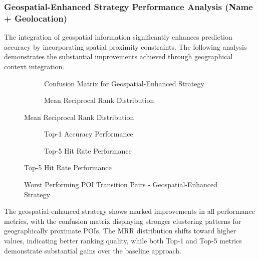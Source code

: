 \subsubsection{Geospatial-Enhanced Strategy Performance Analysis (Name + Geolocation)}

The integration of geospatial information significantly enhances prediction accuracy by incorporating spatial proximity constraints. The following analysis demonstrates the substantial improvements achieved through geographical context integration.

\begin{figure}[h]
\centering
\begin{subfigure}{0.48\textwidth}
\centering
\caption{Confusion Matrix for Geospatial-Enhanced Strategy}
\label{fig:geospatial_confusion}
\end{subfigure}
\hfill
\begin{subfigure}{0.48\textwidth}
\centering
\caption{Mean Reciprocal Rank Distribution}
\label{fig:geospatial_mrr}
\end{subfigure}
\end{figure}

\begin{figure}[h]
\centering
\begin{subfigure}{0.48\textwidth}
\centering
\caption{Top-1 Accuracy Performance}
\label{fig:geospatial_top1}
\end{subfigure}
\hfill
\begin{subfigure}{0.48\textwidth}
\centering
\caption{Top-5 Hit Rate Performance}
\label{fig:geospatial_top5}
\end{subfigure}
\end{figure}

\begin{figure}[h]
\centering
\caption{Worst Performing POI Transition Pairs - Geospatial-Enhanced Strategy}
\label{fig:geospatial_worst_pairs}
\end{figure}

The geospatial-enhanced strategy shows marked improvements in all performance metrics, with the confusion matrix displaying stronger clustering patterns for geographically proximate POIs. The MRR distribution shifts toward higher values, indicating better ranking quality, while both Top-1 and Top-5 metrics demonstrate substantial gains over the baseline approach.

